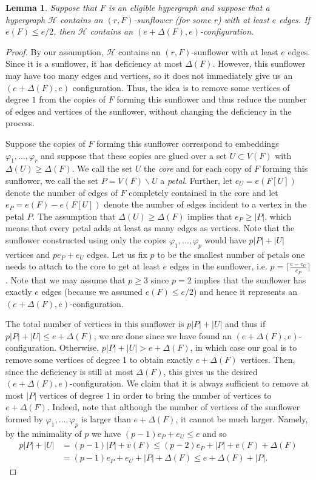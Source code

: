 \documentclass{daj}
\def\cH{\mathcal{H}}
\theoremstyle{plain}
\newtheorem{lemma}[theorem]{Lemma}
\theoremstyle{remark}
\begin{document}
\begin{lemma}\label{lemma:sunflower}
Suppose that $F$ is an eligible hypergraph and suppose that a hypergraph $\cH$ contains an $(r, F)$-sunflower (for some $r$) with at least $e$ edges. If $e(F)\leq e/2$, then $\cH$ contains an $(e+\Delta(F), e)$-configuration.
\end{lemma}
\begin{proof}
By our assumption, $\cH$ contains an $(r, F)$-sunflower with at least $e$ edges. Since it is a sunflower, it has deficiency at most $\Delta(F)$. However, this sunflower may have too many edges and vertices, so it does not immediately give us an $(e+\Delta(F), e)$ configuration. Thus, the idea is to remove some vertices of degree $1$ from the copies of $F$ forming this sunflower and thus reduce the number of edges and vertices of the sunflower, without changing the deficiency in the process.

Suppose the copies of $F$ forming this sunflower correspond to embeddings $\varphi_1, \dots, \varphi_r$ and suppose that these copies are glued over a set $U\subset V(F)$ with $\Delta(U)\geq \Delta(F)$. We call the set $U$ the \textit{core} and  for each copy of $F$ forming this sunflower, we call the set $P=V(F)\backslash U$ a \textit{petal}. Further, let $e_U=e(F[U])$ denote the number of edges of $F$ completely contained in the core and let $e_P=e(F)-e(F[U])$ denote the number of edges incident to a vertex in the petal $P$. The assumption that $\Delta(U)\geq \Delta(F)$ implies that $e_P\geq |P|$, which means that every petal adds at least as many edges as vertices. Note that the sunflower constructed using only the copies $\varphi_1, \dots, \varphi_p$ would have $p|P|+|U|$ vertices and $pe_P+e_U$ edges. Let us fix $p$ to be the smallest number of petals one needs to attach to the core to get at least $e$ edges in the sunflower, i.e. $p=\lceil\frac{e-e_U}{e_P}\rceil$. Note that we may assume that $p\geq 3$ since $p=2$ implies that the sunflower has exactly $e$ edges (because we assumed $e(F) \le e/2$) and hence it represents an $( e+\Delta(F), e)$-configuration.

The total number of vertices in this sunflower is $p|P|+|U|$ and thus if $p|P|+|U|\leq e+\Delta(F)$, we are done since we have found an $(e+\Delta(F), e)$-configuration. Otherwise, $p|P|+|U|> e+\Delta(F)$, in which case our goal is to remove some vertices of degree 1 to obtain exactly $e+\Delta(F)$ vertices. Then, since the deficiency is still at most $\Delta(F)$, this gives us the desired $(e+\Delta(F), e)$-configuration. We claim that it is always sufficient to remove at most $|P|$ vertices of degree $1$ in order to bring the number of vertices to $e+\Delta(F)$. Indeed, note that although the number of vertices of the sunflower formed by $\varphi_1, \dots, \varphi_p$ is larger than $e+\Delta(F)$, it cannot be much larger. Namely, by the minimality of $p$ we have $(p-1) e_P+e_U\leq e$ and so 
\begin{align*}
    p|P|+|U|&= (p-1)|P|+ v(F)\leq (p-2)e_P + |P| + e(F)+\Delta(F)\\
    &= (p-1)e_P+e_U+|P|+\Delta(F)\leq e+\Delta(F)+|P|.
\end{align*}


\end{proof}
\end{document}

